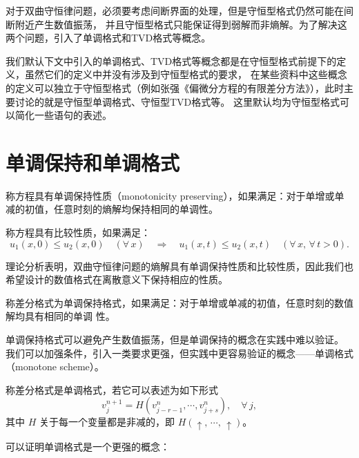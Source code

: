 对于双曲守恒律问题，必须要考虑间断界面的处理，但是守恒型格式仍然可能在间断附近产生数值振荡，
并且守恒型格式只能保证得到弱解而非熵解。为了解决这两个问题，引入了单调格式和TVD格式等概念。

\begin{remark}
    我们默认下文中引入的单调格式、TVD格式等概念都是在守恒型格式前提下的定义，虽然它们的定义中并没有涉及到守恒型格式的要求，
    在某些资料中这些概念的定义可以独立于守恒型格式（例如张强《偏微分方程的有限差分方法》），此时主要讨论的就是守恒型单调格式、守恒型TVD格式等。
    这里默认均为守恒型格式可以简化一些语句的表述。
\end{remark}

\section{单调保持和单调格式}

\begin{definition}
    称方程具有单调保持性质（monotonicity preserving），如果满足：对于单增或单减的初值，任意时刻的熵解均保持相同的单调性。
\end{definition}

\begin{definition}
    称方程具有比较性质，如果满足：
    \[
        u_1(x,0) \le u_2(x,0)\quad(\forall\, x) \quad \Rightarrow \quad
        u_1(x,t) \le u_2(x,t)\quad(\forall\, x,\,\forall\,t > 0).
    \]
\end{definition}

理论分析表明，双曲守恒律问题的熵解具有单调保持性质和比较性质，因此我们也希望设计的数值格式在离散意义下保持相应的性质。

\begin{definition}[单调保持格式]
    称差分格式为单调保持格式，如果满足：对于单增或单减的初值，任意时刻的数值解均具有相同的单调
    性。
\end{definition}

单调保持格式可以避免产生数值振荡，但是单调保持的概念在实践中难以验证。
我们可以加强条件，引入一类要求更强，但实践中更容易验证的概念——单调格式（monotone scheme）。

\begin{definition}[单调格式]
    称差分格式是单调格式，若它可以表述为如下形式
    \[
        v_j^{n+1} = H(v_{j-r-1}^n,\cdots,v_{j+s}^n),\quad \forall\,j,
    \]
    其中 $H$ 关于每一个变量都是非减的，即 $H(\uparrow,\,\cdots,\,\uparrow)$。
\end{definition}


可以证明单调格式是一个更强的概念：

